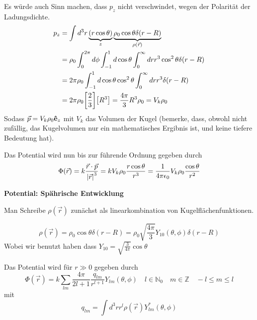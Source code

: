 \begin{enumerate}[label=\alph*)]
    Es würde auch Sinn machen, dass $p_z$ nicht verschwindet, wegen der
    Polarität der Ladungsdichte.
    \begin{equation*}
      \begin{split}
        p_z
        &=\int d^3 r \underbrace{(r \cos\theta)}_{z} 
        \underbrace{\rho_0 \cos\theta \delta(r-R)}_{\rho(\vec r)}\\
        &=
        \rho_0
        \int_0^{2\pi}d\phi
        \int_{-1}^{1}d\cos\theta 
        \int_0^{\infty} dr r^3 \cos^2\theta \delta(r-R)\\
        &=
        2\pi\rho_0
        \int_{-1}^{1}d\cos\theta \cos^2\theta 
        \int_0^{\infty} dr r^3 \delta(r-R)\\
        &=
        2\pi\rho_0
        \qty[\frac{2}{3}]
        \qty[R^3]
        =
        \frac{4\pi}{3}R^3 \rho_0
        =V_k \rho_0
      \end{split}
    \end{equation*}
    Sodass $\vec p=V_k\rho_0 \vu e_z$ mit $V_k$ das Volumen der Kugel
    (bemerke, dass, obwohl nicht zufällig, das Kugelvolumen nur ein
    mathematisches Ergibnis ist, und keine tiefere Bedeutung hat).

    Das Potential wird nun bis zur führende Ordnung gegeben durch
    \begin{equation}
      \Phi(\vec r)= k\frac{\vec r\cdot\vec p}{\abs{\vec r}^3}
      = kV_k\rho_0 \frac{r\cos\theta}{r^3} 
      = \frac{1}{4\pi\epsilon_0} V_k\rho_0 \frac{\cos\theta}{r^2} 
    \end{equation}

    \textbf{Potential: Spährische Entwicklung} 
    
    Man Schreibe $\rho(\vec r)$ zunächst als linearkombination von
    Kugelflächenfunktionen.

    \begin{equation*}
      \rho(\vec r)
      =\rho_0\cos\theta\delta(r-R)
      =\rho_0\sqrt{\frac{4\pi}{3}}Y_{10}(\theta,\phi)\delta(r-R)
    \end{equation*}
    Wobei wir benutzt haben dass $Y_{10}=\sqrt{\frac{3}{4\pi}}\cos\theta$

    Das Potential wird für $r\gg0$ gegeben durch
    \begin{equation}
      \Phi(\vec r)
      =k\sum_{lm}\frac{4\pi}{2l+1}\frac{q_{lm}}{r^{l+1}}Y_{lm}(\theta,\phi)
      \quad l\in\mathbb{N}_0\quad m\in\mathbb{Z}\quad -l\le m\le l
    \end{equation}
    mit
    \begin{equation}
      q_{lm}=\int d^3 r r^l \rho(\vec r) Y^*_{lm}(\theta,\phi)
    \end{equation}
    

\end{enumerate}
